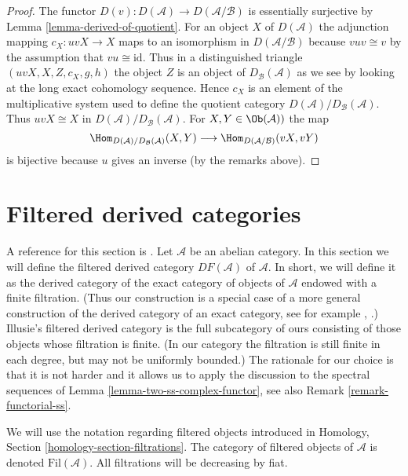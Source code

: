 \begin{proof}
The functor $D(v) : D(\mathcal{A}) \to D(\mathcal{A}/\mathcal{B})$
is essentially surjective by
Lemma \ref{lemma-derived-of-quotient}.
For an object $X$ of $D(\mathcal{A})$ the adjunction mapping
$c_X : uvX \to X$ maps to an isomorphism in $D(\mathcal{A}/\mathcal{B})$
because $vuv \cong v$ by the assumption that $vu \cong \text{id}$.
Thus in a distinguished triangle $(uvX, X, Z, c_X, g, h)$ the object
$Z$ is an object of $D_\mathcal{B}(\mathcal{A})$ as we see by looking
at the long exact cohomology sequence.
Hence $c_X$ is an element of the multiplicative system used to define
the quotient category $D(\mathcal{A})/D_\mathcal{B}(\mathcal{A})$.
Thus $uvX \cong X$ in $D(\mathcal{A})/D_\mathcal{B}(\mathcal{A})$.
For $X, Y \in \Ob(\mathcal{A}))$ the map
$$
\Hom_{D(\mathcal{A})/D_\mathcal{B}(\mathcal{A})}(X, Y)
\longrightarrow
\Hom_{D(\mathcal{A}/\mathcal{B})}(vX, vY)
$$
is bijective because $u$ gives an inverse (by the remarks above).
\end{proof}









\section{Filtered derived categories}
\label{section-filtered-derived-category}

\noindent
A reference for this section is \cite[I, Chapter V]{cotangent}. Let
$\mathcal{A}$ be an abelian category. In this section we will define the
filtered derived category $DF(\mathcal{A})$ of $\mathcal{A}$.
In short, we will define it as the derived category
of the exact category of objects of $\mathcal{A}$ endowed with a finite
filtration. (Thus our construction is a special case of a
more general construction of the derived category of an
exact category, see for example \cite{Buhler}, \cite{Keller}.)
Illusie's filtered derived category is the full subcategory
of ours consisting of those objects whose filtration is finite.
(In our category the filtration is still finite in each degree, but may
not be uniformly bounded.) The rationale for our choice is that it is not
harder and it allows us to apply the discussion to the spectral sequences of
Lemma \ref{lemma-two-ss-complex-functor}, see also
Remark \ref{remark-functorial-ss}.

\medskip\noindent
We will use the notation regarding filtered objects introduced in
Homology, Section \ref{homology-section-filtrations}.
The category of filtered objects of $\mathcal{A}$ is
denoted $\text{Fil}(\mathcal{A})$.
All filtrations will be decreasing by fiat.


